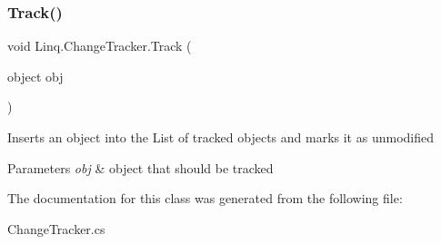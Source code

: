 \subsubsection{\texorpdfstring{Track()}{Track()}}
{\footnotesize\ttfamily void Linq.\+Change\+Tracker.\+Track (\begin{DoxyParamCaption}\item[{object}]{obj }\end{DoxyParamCaption})\hspace{0.3cm}{\ttfamily [inline]}}



Inserts an object into the List of tracked objects and marks it as unmodified 


\begin{DoxyParams}{Parameters}
{\em obj} & object that should be tracked\\
\hline
\end{DoxyParams}


The documentation for this class was generated from the following file\+:\begin{DoxyCompactItemize}
\item 
Change\+Tracker.\+cs\end{DoxyCompactItemize}
